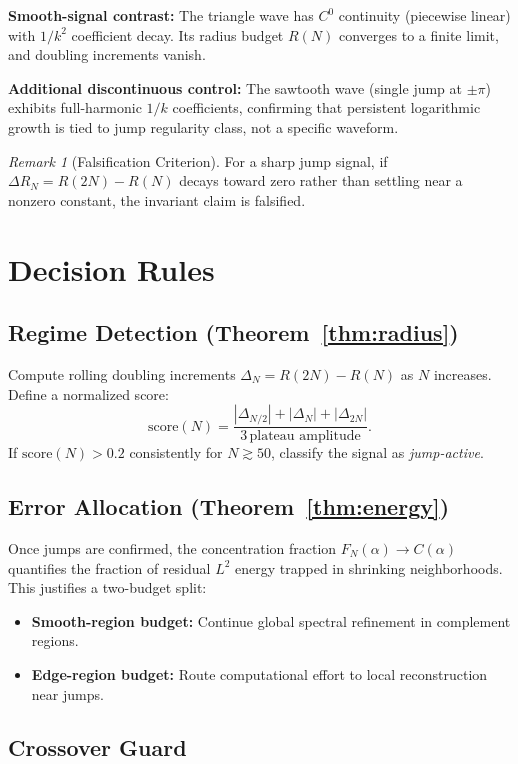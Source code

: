 \documentclass[11pt,letterpaper]{article}
\theoremstyle{remark}
\newtheorem*{remark}{Remark}
\begin{document}
\textbf{Smooth-signal contrast:} The triangle wave has $C^0$ continuity (piecewise linear) with $1/k^2$ coefficient decay. Its radius budget $R(N)$ converges to a finite limit, and doubling increments vanish.

\textbf{Additional discontinuous control:} The sawtooth wave (single jump at $\pm \pi$) exhibits full-harmonic $1/k$ coefficients, confirming that persistent logarithmic growth is tied to jump regularity class, not a specific waveform.

\begin{remark}[Falsification Criterion]
For a sharp jump signal, if $\Delta R_N = R(2N) - R(N)$ decays toward zero rather than settling near a nonzero constant, the invariant claim is falsified.
\end{remark}

\section{Decision Rules}

\subsection{Regime Detection (Theorem~\ref{thm:radius})}

Compute rolling doubling increments $\Delta_N = R(2N) - R(N)$ as $N$ increases. Define a normalized score:
\[
\text{score}(N) = \frac{|\Delta_{N/2}| + |\Delta_N| + |\Delta_{2N}|}{3 \,\text{plateau amplitude}}.
\]
If $\text{score}(N) > 0.2$ consistently for $N \gtrsim 50$, classify the signal as \emph{jump-active}.

\subsection{Error Allocation (Theorem~\ref{thm:energy})}

Once jumps are confirmed, the concentration fraction $F_N(\alpha) \to C(\alpha)$ quantifies the fraction of residual $L^2$ energy trapped in shrinking neighborhoods. This justifies a two-budget split:
\begin{itemize}[nosep]
\item \textbf{Smooth-region budget:} Continue global spectral refinement in complement regions.
\item \textbf{Edge-region budget:} Route computational effort to local reconstruction near jumps.
\end{itemize}

\subsection{Crossover Guard}
\end{document}
